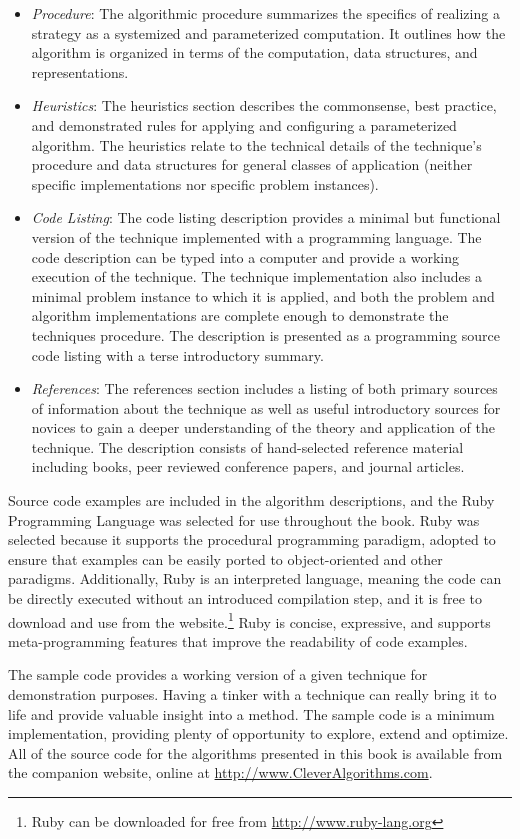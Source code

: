 \begin{bibunit}
\begin{itemize}
	\item \emph{Procedure}: The algorithmic procedure summarizes the specifics of realizing a strategy as a systemized and parameterized computation. It outlines how the algorithm is organized in terms of the computation, data structures, and representations. 
	\item \emph{Heuristics}: The heuristics section describes the commonsense, best practice, and demonstrated rules for applying and configuring a parameterized algorithm. The heuristics relate to the technical details of the technique's procedure and data structures for general classes of application (neither specific implementations nor specific problem instances).
	\item \emph{Code Listing}: The code listing description provides a minimal but functional version of the technique implemented with a programming language. The code description can be typed into a computer and provide a working execution of the technique. The technique implementation also includes a minimal problem instance to which it is applied, and both the problem and algorithm implementations are complete enough to demonstrate the techniques procedure. The description is presented as a programming source code listing with a terse introductory summary.
	\item \emph{References}: The references section includes a listing of both primary sources of information about the technique as well as useful introductory sources for novices to gain a deeper understanding of the theory and application of the technique. The description consists of hand-selected reference material including books, peer reviewed conference papers, and journal articles.
\end{itemize}

Source code examples are included in the algorithm descriptions, and the Ruby Programming Language was selected for use throughout the book. Ruby was selected because it supports the procedural programming paradigm, adopted to ensure that examples can be easily ported to object-oriented and other paradigms. Additionally, Ruby is an interpreted language, meaning the code can be directly executed without an introduced compilation step, and it is free to download and use from the website.\footnote{Ruby can be downloaded for free from \url{http://www.ruby-lang.org}} Ruby is concise, expressive, and supports meta-programming features that improve the readability of code examples. 

The sample code provides a working version of a given technique for demonstration purposes. Having a tinker with a technique can really bring it to life and provide valuable insight into a method. The sample code is a minimum implementation, providing plenty of opportunity to explore, extend and optimize.
All of the source code for the algorithms presented in this book is available from the companion website, online at \url{http://www.CleverAlgorithms.com}.


\end{bibunit}
